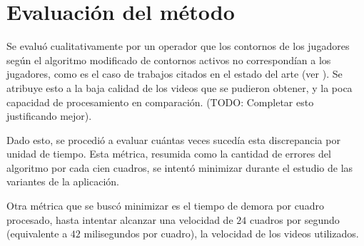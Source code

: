 \section{Evaluación del método}

Se evaluó cualitativamente por un operador que los contornos de los jugadores según el algoritmo modificado de contornos activos no correspondían a los jugadores, como es el caso de trabajos citados en el estado del arte (ver \cite{papers-tanos}). Se atribuye esto a la baja calidad de los videos que se pudieron obtener, y la poca capacidad de procesamiento en comparación. (TODO: Completar esto justificando mejor).

Dado esto, se procedió a evaluar cuántas veces sucedía esta discrepancia por unidad de tiempo. Esta métrica, resumida como la cantidad de errores del algoritmo por cada cien cuadros, se intentó minimizar durante el estudio de las variantes de la aplicación.

Otra métrica que se buscó minimizar es el tiempo de demora por cuadro procesado, hasta intentar alcanzar una velocidad de $24$ cuadros por segundo (equivalente a $42$ milisegundos por cuadro), la velocidad de los videos utilizados.



